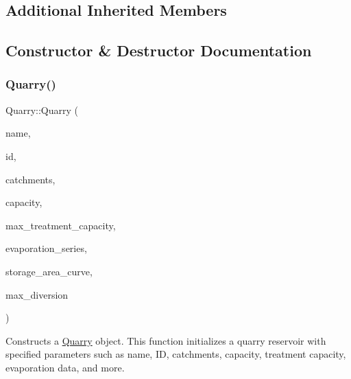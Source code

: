 \subsection*{Additional Inherited Members}


\subsection{Constructor \& Destructor Documentation}
\mbox{\label{classQuarry_a126fddda9e5deeb667a6a9dbb0533470}} 
\subsubsection{\texorpdfstring{Quarry()}{Quarry()}\hspace{0.1cm}{\footnotesize\ttfamily [1/5]}}
{\footnotesize\ttfamily Quarry\+::\+Quarry (\begin{DoxyParamCaption}\item[{const char $\ast$}]{name,  }\item[{const int}]{id,  }\item[{const vector$<$ \mbox{\hyperlink{classCatchment}{Catchment}} $\ast$$>$ \&}]{catchments,  }\item[{const double}]{capacity,  }\item[{const double}]{max\+\_\+treatment\+\_\+capacity,  }\item[{Evaporation\+Series \&}]{evaporation\+\_\+series,  }\item[{Data\+Series $\ast$}]{storage\+\_\+area\+\_\+curve,  }\item[{double}]{max\+\_\+diversion }\end{DoxyParamCaption})}



Constructs a \mbox{\hyperlink{classQuarry}{Quarry}} object. This function initializes a quarry reservoir with specified parameters such as name, ID, catchments, capacity, treatment capacity, evaporation data, and more. 


